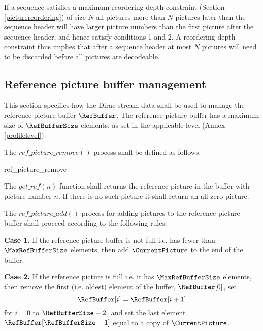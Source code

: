 \begin{informative}
If a sequence satisfies a maximum reordering depth constraint (Section \ref{picturereordering})
of size $N$ all pictures more than $N$ pictures later than the sequence header will
have larger picture numbers than the first picture after the sequence header, and hence 
satisfy conditions 1 and 2. A reordering depth constraint thus implies that after a 
sequence header at most $N$ pictures will need to be discarded before all pictures are decodeable.
\end{informative}
\subsection{Reference picture buffer management}
\label{refbuffer}

This section specifies how the Dirac stream data shall be used to manage the reference 
picture buffer $\RefBuffer$. The reference picture buffer has a maximum size of
$\RefBufferSize$ elements, as set in the applicable level (Annex \ref{profilelevel}).

The $ref\_picture\_remove()$ process shall be defined as
follows:

\begin{pseudo}{ref\_picture\_remove}{}
            \bsCODE{\RefBuffer[j]=\RefBuffer[j+1]}
        \bsEND
    \bsEND
\bsEND
\end{pseudo}

The $get\_ref(n)$ function shall returns the reference picture in the buffer with 
picture number $n$.  If there is no such picture it shall return an all-zero picture.

The $ref\_picture\_add()$ process for adding pictures to the reference picture
buffer shall proceed according to the following rules:

{\bf Case 1.} If the reference picture buffer is not full i.e. has fewer than $\MaxRefBufferSize$ elements,
then add $\CurrentPicture$ to the end of the buffer. 

{\bf Case 2.} If the reference picture is full i.e. it has $\MaxRefBufferSize$ elements, then remove the
first (i.e. oldest) element of the buffer, $\RefBuffer[0]$, set
\[\RefBuffer[i] = \RefBuffer[i+1] \]
for $i=0$ to $\RefBufferSize-2$, and set the last element $\RefBuffer[\RefBufferSize-1]$ equal to
a copy of $\CurrentPicture$.

